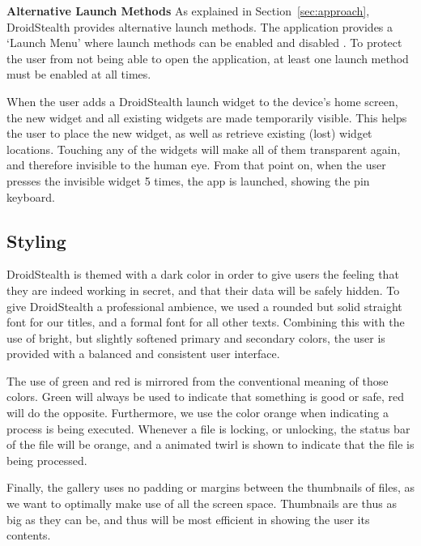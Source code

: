 \textbf{Alternative Launch Methods}
As explained in Section~\ref{sec:approach}, DroidStealth provides alternative launch methods.
The application provides a `Launch Menu' where launch methods can be enabled and disabled .
To protect the user from not being able to open the application, at least one launch method must be enabled at all times.

When the user adds a DroidStealth launch widget to the device's home screen, the new widget and all existing widgets are made temporarily visible.
This helps the user to place the new widget, as well as retrieve existing (lost) widget locations.
Touching any of the widgets will make all of them transparent again, and therefore invisible to the human eye.
From that point on, when the user presses the invisible widget 5 times, the app is launched, showing the pin keyboard.

\subsection{Styling}

DroidStealth is themed with a dark color in order to give users the feeling that they are indeed working in secret, and that their data will be safely hidden.
To give DroidStealth a professional ambience, we used a rounded but solid straight font for our titles, and a formal font for all other texts.
Combining this with the use of bright, but slightly softened primary and secondary colors, the user is provided with a balanced and consistent user interface.

The use of green and red is mirrored from the conventional meaning of those colors.
Green will always be used to indicate that something is good or safe, red will do the opposite.
Furthermore, we use the color orange when indicating a process is being executed.
Whenever a file is locking, or unlocking, the status bar of the file will be orange, and a animated twirl is shown to indicate that the file is being processed.

Finally, the gallery uses no padding or margins between the thumbnails of files, as we want to optimally make use of all the screen space.
Thumbnails are thus as big as they can be, and thus will be most efficient in showing the user its contents.
